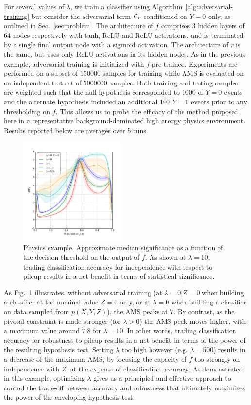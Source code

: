 \documentclass{article}
\theoremstyle{plain}
\begin{document}
For several values of $\lambda$, we train a classifier
using  Algorithm~\ref{alg:adversarial-training} but consider the adversarial
term ${\cal L}_r$ conditioned on $Y=0$ only, as outlined in
Sec.~\ref{sec:problem}. The architecture of $f$ comprises 3 hidden layers of 64 nodes
respectively with tanh, ReLU and ReLU activations, and is terminated by a single final
output node with a sigmoid activation. The architecture of $r$ is the same,
but uses only ReLU activations in its hidden nodes.
As in the previous example, adversarial training is initialized
with $f$ pre-trained. Experiments are performed on a subset of
150000 samples for training while AMS is evaluated on an independent test set of
5000000 samples. Both training and testing samples are weighted such that the
null hypothesis corresponded to 1000  of $Y=0$ events and the alternate
hypothesis included an additional 100 $Y=1$ events prior to any thresholding on $f$.
This allows us to probe the efficacy of the
method proposed here in a representative background-dominated high energy physics environment.
Results reported below are averages over 5 runs.

\begin{figure}
    \includegraphics[width=0.48\textwidth]{../figures/ams.pdf}
    \caption{Physics example. Approximate median significance as a function of the decision threshold
             on the output of $f$.  As shown at $\lambda=10$, trading
             classification accuracy for independence with respect to pileup
             results in a net benefit in terms of statistical significance.}
    \label{fig:physics-ams}
\end{figure}

As  Fig.~\ref{fig:physics-ams} illustrates, without adversarial training (at
$\lambda=0|Z=0$ when building a classifier at the nominal value $Z=0$ only, or
at $\lambda=0$ when building a classifier on data sampled from $p(X,Y,Z)$), the
AMS peaks at $7$. By contrast, as the pivotal constraint
is made stronger (for $\lambda > 0$) the AMS peak moves higher, with a maximum
value around  $7.8$ for $\lambda=10$. In other words, trading classification
accuracy for robustness to pileup results in a net
benefit in terms of the power of the resulting hypothesis test. Setting $\lambda$ too high however
(e.g. $\lambda=500$) results in a decrease of the maximum AMS, by
focusing the capacity of $f$ too strongly on independence with $Z$, at the expense of
classification accuracy. As demonstrated in this example, optimizing $\lambda$
gives us a principled and effective approach to control the trade-off between
accuracy and robustness that ultimately maximizes the
power of the enveloping hypothesis test.
\end{document}
